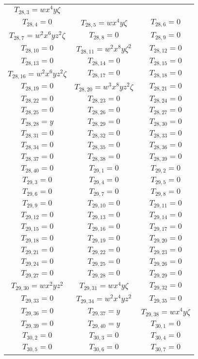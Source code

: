 \documentclass[12pt]{memoireuqam1.3}
\begin{document}
\begin{longtable}{|c|c|c|}
$T_{28,3}= wx^4y\zeta$\\
$T_{28,4}= 0$&
$T_{28,5}= wx^4y\zeta$&
$T_{28,6}= 0$\\
$T_{28,7}= w^2x^6yz^2\zeta$&
$T_{28,8}= 0$&
$T_{28,9}= 0$\\
$T_{28,10}= 0$&
$T_{28,11}= w^2x^8y\zeta^2$&
$T_{28,12}= 0$\\
$T_{28,13}= 0$&
$T_{28,14}= 0$&
$T_{28,15}= 0$\\
$T_{28,16}= w^2x^6yz^2\zeta$&
$T_{28,17}= 0$&
$T_{28,18}= 0$\\
$T_{28,19}= 0$&
$T_{28,20}= w^3x^8yz^2\zeta$&
$T_{28,21}= 0$\\
$T_{28,22}= 0$&
$T_{28,23}= 0$&
$T_{28,24}= 0$\\
$T_{28,25}= 0$&
$T_{28,26}= 0$&
$T_{28,27}= 0$\\
$T_{28,28}= y$&
$T_{28,29}= 0$&
$T_{28,30}= 0$\\
$T_{28,31}= 0$&
$T_{28,32}= 0$&
$T_{28,33}= 0$\\
$T_{28,34}= 0$&
$T_{28,35}= 0$&
$T_{28,36}= 0$\\
$T_{28,37}= 0$&
$T_{28,38}= 0$&
$T_{28,39}= 0$\\
$T_{28,40}= 0$&
$T_{29,1}= 0$&
$T_{29,2}= 0$\\
$T_{29,3}= 0$&
$T_{29,4}= 0$&
$T_{29,5}= 0$\\
$T_{29,6}= 0$&
$T_{29,7}= 0$&
$T_{29,8}= 0$\\
$T_{29,9}= 0$&
$T_{29,10}= 0$&
$T_{29,11}= 0$\\
$T_{29,12}= 0$&
$T_{29,13}= 0$&
$T_{29,14}= 0$\\
$T_{29,15}= 0$&
$T_{29,16}= 0$&
$T_{29,17}= 0$\\
$T_{29,18}= 0$&
$T_{29,19}= 0$&
$T_{29,20}= 0$\\
$T_{29,21}= 0$&
$T_{29,22}= 0$&
$T_{29,23}= 0$\\
$T_{29,24}= 0$&
$T_{29,25}= 0$&
$T_{29,26}= 0$\\
$T_{29,27}= 0$&
$T_{29,28}= 0$&
$T_{29,29}= 0$\\
$T_{29,30}= wx^2yz^2$&
$T_{29,31}= wx^4y\zeta$&
$T_{29,32}= 0$\\
$T_{29,33}= 0$&
$T_{29,34}= w^2x^4yz^2$&
$T_{29,35}= 0$\\
$T_{29,36}= 0$&
$T_{29,37}= y$&
$T_{29,38}= wx^4y\zeta$\\
$T_{29,39}= 0$&
$T_{29,40}= y$&
$T_{30,1}= 0$\\
$T_{30,2}= 0$&
$T_{30,3}= 0$&
$T_{30,4}= 0$\\
$T_{30,5}= 0$&
$T_{30,6}= 0$&
$T_{30,7}= 0$\\

\end{longtable}
\end{document}
